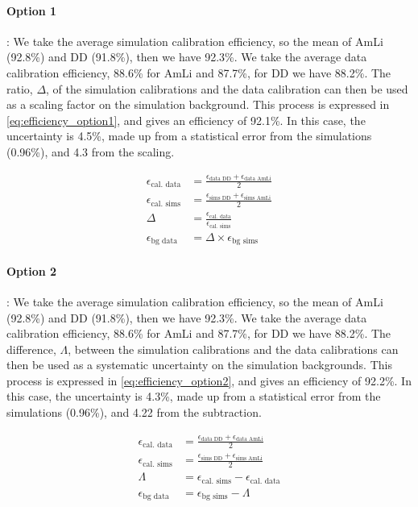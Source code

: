 \paragraph{Option 1}:
We take the average simulation calibration efficiency, so the mean of AmLi (92.8\%) and DD (91.8\%), then we have 92.3\%.
We take the average data calibration efficiency, 88.6\% for AmLi and 87.7\%, for DD we have 88.2\%.
The ratio, $\Delta$, of the simulation calibrations and the data calibration can then be used as a scaling factor on the simulation background.
This process is expressed in \autoref{eq:efficiency_option1}, and gives an efficiency of 92.1\%.
In this case, the uncertainty is 4.5\%, made up from a statistical error from the simulations (0.96\%), and 4.3 from the scaling.

\begin{align}
	\epsilon_{\textrm{cal. data}} & = \frac{\epsilon_{\textrm{data DD}} + \epsilon_{\textrm{data AmLi}}}{2} \\
	\epsilon_{\textrm{cal. sims}} & = \frac{\epsilon_{\textrm{sims DD}} + \epsilon_{\textrm{sims AmLi}}}{2} \\
	\Delta                        & = \frac{\epsilon_{\textrm{cal. data}}}{\epsilon_{\textrm{cal. sims}}}   \\
	\epsilon_{\textrm{bg data}}   & = \Delta \times \epsilon_{\textrm{bg sims}}
	\label{eq:efficiency_option1}
\end{align}

\paragraph{Option 2}:
We take the average simulation calibration efficiency, so the mean of AmLi (92.8\%) and DD (91.8\%), then we have 92.3\%.
We take the average data calibration efficiency, 88.6\% for AmLi and 87.7\%, for DD we have 88.2\%.
The difference, $\Lambda$, between the simulation calibrations and the data calibrations can then be used as a systematic uncertainty on the simulation backgrounds.
This process is expressed in \autoref{eq:efficiency_option2}, and gives an efficiency of 92.2\%.
In this case, the uncertainty is 4.3\%, made up from a statistical error from the simulations (0.96\%), and 4.22 from the subtraction.

\begin{align}
	\epsilon_{\textrm{cal. data}} & = \frac{\epsilon_{\textrm{data DD}} + \epsilon_{\textrm{data AmLi}}}{2} \\
	\epsilon_{\textrm{cal. sims}} & = \frac{\epsilon_{\textrm{sims DD}} + \epsilon_{\textrm{sims AmLi}}}{2} \\
	\Lambda                       & = \epsilon_{\textrm{cal. sims}} - \epsilon_{\textrm{cal. data}}         \\
	\epsilon_{\textrm{bg data}}   & = \epsilon_{\textrm{bg sims}} - \Lambda
	\label{eq:efficiency_option2}
\end{align}

